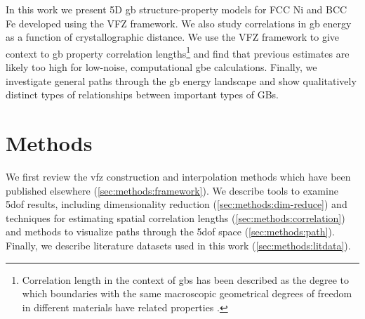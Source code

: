 \documentclass[final,twocolumn,12pt]{elsarticle}
\begin{document}
	In this work we present 5D \gls{gb} structure-property models for FCC Ni and BCC Fe developed using the VFZ framework. We also study correlations in \gls{gb} energy as a function of crystallographic distance. We use the VFZ framework to give context to \gls{gb} property correlation lengths\footnote{Correlation length in the context of \glspl{gb} has been described as the degree to which boundaries with the same
    macroscopic geometrical degrees of freedom in different materials have related properties \cite{olmstedSurveyComputedGrain2009}. } and find that previous estimates are likely too high for low-noise, computational \gls{gbe} calculations. Finally, we investigate general paths through the \gls{gb} energy landscape and show qualitatively distinct types of relationships between important types of GBs.
	
	
	
	

	
	\section{Methods} \label{sec:methods}
	We first review the \gls{vfz} construction and interpolation methods which have been published elsewhere \cite{bairdFiveDegreeofFreedomPropertyUnderReview} (\cref{sec:methods:framework}). We describe tools to examine \gls{5dof} results, including dimensionality reduction (\cref{sec:methods:dim-reduce}) and techniques for estimating spatial correlation lengths (\cref{sec:methods:correlation}) and methods to visualize paths through the \gls{5dof} space (\cref{sec:methods:path}). Finally, we describe literature datasets used in this work (\cref{sec:methods:litdata}).
	
\end{document}
